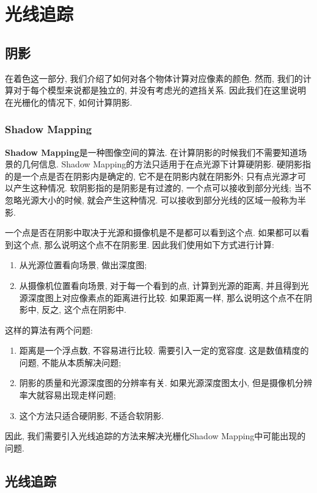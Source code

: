 \part{光线追踪}

\chapter{阴影}

在着色这一部分, 我们介绍了如何对各个物体计算对应像素的颜色. 然而, 我们的计算对于每个模型来说都是独立的, 并没有考虑光的遮挡关系. 因此我们在这里说明在光栅化的情况下, 如何计算阴影. 

\section{Shadow Mapping}
\textbf{Shadow Mapping}是一种图像空间的算法. 在计算阴影的时候我们不需要知道场景的几何信息. Shadow Mapping的方法只适用于在点光源下计算硬阴影. 硬阴影指的是一个点是否在阴影内是确定的, 它不是在阴影内就在阴影外; 只有点光源才可以产生这种情况. 软阴影指的是阴影是有过渡的, 一个点可以接收到部分光线; 当不忽略光源大小的时候, 就会产生这种情况. 可以接收到部分光线的区域一般称为半影. 

一个点是否在阴影中取决于光源和摄像机是不是都可以看到这个点. 如果都可以看到这个点, 那么说明这个点不在阴影里. 因此我们使用如下方式进行计算: 
\begin{enumerate}
	\item 从光源位置看向场景, 做出深度图; 
	\item 从摄像机位置看向场景, 对于每一个看到的点, 计算到光源的距离, 并且得到光源深度图上对应像素点的距离进行比较. 如果距离一样, 那么说明这个点不在阴影中, 反之, 这个点在阴影中. 
\end{enumerate}

这样的算法有两个问题: 
\begin{enumerate}
	\item 距离是一个浮点数, 不容易进行比较. 需要引入一定的宽容度. 这是数值精度的问题, 不能从本质解决问题; 
	\item 阴影的质量和光源深度图的分辨率有关. 如果光源深度图太小, 但是摄像机分辨率大就容易出现走样问题; 
	\item 这个方法只适合硬阴影, 不适合软阴影. 
\end{enumerate}

因此, 我们需要引入光线追踪的方法来解决光栅化Shadow Mapping中可能出现的问题. 

\chapter{光线追踪}


